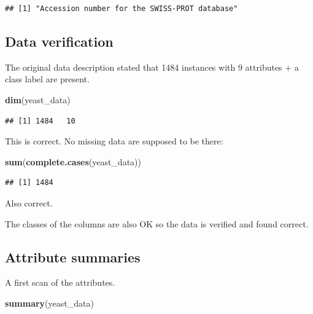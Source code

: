 \documentclass[]{book}
\newenvironment{Shaded}{\begin{snugshade}}{\end{snugshade}}
\newcommand{\KeywordTok}[1]{\textcolor[rgb]{0.13,0.29,0.53}{\textbf{#1}}}
\newcommand{\NormalTok}[1]{#1}
\begin{document}
\begin{verbatim}
## [1] "Accession number for the SWISS-PROT database"
\end{verbatim}

\hypertarget{data-verification}{%
\subsection{Data verification}\label{data-verification}}

The original data description stated that 1484 instances with 9 attributes + a class label are present.

\begin{Shaded}
\begin{Highlighting}[]
\KeywordTok{dim}\NormalTok{(yeast_data)}
\end{Highlighting}
\end{Shaded}

\begin{verbatim}
## [1] 1484   10
\end{verbatim}

This is correct.
No missing data are supposed to be there:

\begin{Shaded}
\begin{Highlighting}[]
\KeywordTok{sum}\NormalTok{(}\KeywordTok{complete.cases}\NormalTok{(yeast_data))}
\end{Highlighting}
\end{Shaded}

\begin{verbatim}
## [1] 1484
\end{verbatim}

Also correct.

The classes of the columns are also OK so the data is verified and found correct.

\hypertarget{attribute-summaries}{%
\subsection{Attribute summaries}\label{attribute-summaries}}

A first scan of the attributes.

\begin{Shaded}
\begin{Highlighting}[]
\KeywordTok{summary}\NormalTok{(yeast_data)}
\end{Highlighting}
\end{Shaded}
\end{document}
